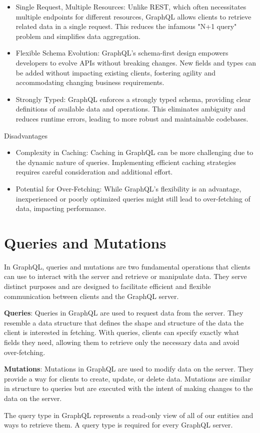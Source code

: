 \documentclass[a4paper,12pt]{article}
\begin{document}
\begin{large}
\begin{itemize}
\item Single Request, Multiple Resources: Unlike REST, which often necessitates multiple endpoints for different resources, GraphQL allows clients to retrieve related data in a single request. This reduces the infamous "N+1 query" problem and simplifies data aggregation.

\item Flexible Schema Evolution: GraphQL's schema-first design empowers developers to evolve APIs without breaking changes. New fields and types can be added without impacting existing clients, fostering agility and accommodating changing business requirements.

\item Strongly Typed: GraphQL enforces a strongly typed schema, providing clear definitions of available data and operations. This eliminates ambiguity and reduces runtime errors, leading to more robust and maintainable codebases.
\end{itemize}

Disadvantages


\begin{itemize}
\item Complexity in Caching: Caching in GraphQL can be more challenging due to the dynamic nature of queries. Implementing efficient caching strategies requires careful consideration and additional effort.

\item Potential for Over-Fetching: While GraphQL's flexibility is an advantage, inexperienced or poorly optimized queries might still lead to over-fetching of data, impacting performance.
\end{itemize}


\section{Queries and Mutations}
 
In GraphQL, queries and mutations are two fundamental operations that clients can use to interact with the server and retrieve or manipulate data. They serve distinct purposes and are designed to facilitate efficient and flexible communication between clients and the GraphQL server.

\textbf{Queries}: Queries in GraphQL are used to request data from the server. They resemble a data structure that defines the shape and structure of the data the client is interested in fetching. With queries, clients can specify exactly what fields they need, allowing them to retrieve only the necessary data and avoid over-fetching.

\textbf{Mutations}: Mutations in GraphQL are used to modify data on the server. They provide a way for clients to create, update, or delete data. Mutations are similar in structure to queries but are executed with the intent of making changes to the data on the server.

The query type in GraphQL represents a read-only view of all of our entities and ways to retrieve them. A query type is required for every GraphQL server.




\end{large}
\end{document}
